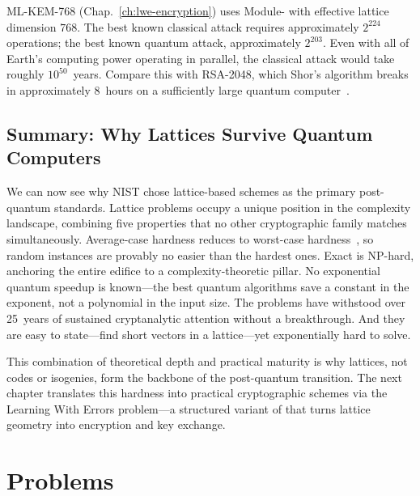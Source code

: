 \begin{example}
\label{ex:breaking-kyber}
ML-KEM-768 (Chap.~\ref{ch:lwe-encryption}) uses Module-\lwe{} with effective lattice dimension $768$.  The best known classical attack requires approximately $2^{224}$ operations; the best known quantum attack, approximately $2^{203}$.  Even with all of Earth's computing power operating in parallel, the classical attack would take roughly $10^{50}$~years.  Compare this with RSA-2048, which Shor's algorithm breaks in approximately 8~hours on a sufficiently large quantum computer~\cite{GidneyEkera2021}.
\end{example}


\subsection{Summary: Why Lattices Survive Quantum Computers}
\label{subsec:lattice-summary}

We can now see why NIST chose lattice-based schemes as the primary post-quantum standards.  Lattice problems occupy a unique position in the complexity landscape, combining five properties that no other cryptographic family matches simultaneously.  Average-case hardness reduces to worst-case hardness~\cite{Ajtai1996, Regev2009}, so random instances are provably no easier than the hardest ones.  Exact \svp{} is NP-hard, anchoring the entire edifice to a complexity-theoretic pillar.  No exponential quantum speedup is known---the best quantum algorithms save a constant in the exponent, not a polynomial in the input size.  The problems have withstood over 25~years of sustained cryptanalytic attention without a breakthrough.  And they are easy to state---find short vectors in a lattice---yet exponentially hard to solve.

This combination of theoretical depth and practical maturity is why lattices, not codes or isogenies, form the backbone of the post-quantum transition.  The next chapter translates this hardness into practical cryptographic schemes via the Learning With Errors problem---a structured variant of \cvp{} that turns lattice geometry into encryption and key exchange.


\section*{Problems}

